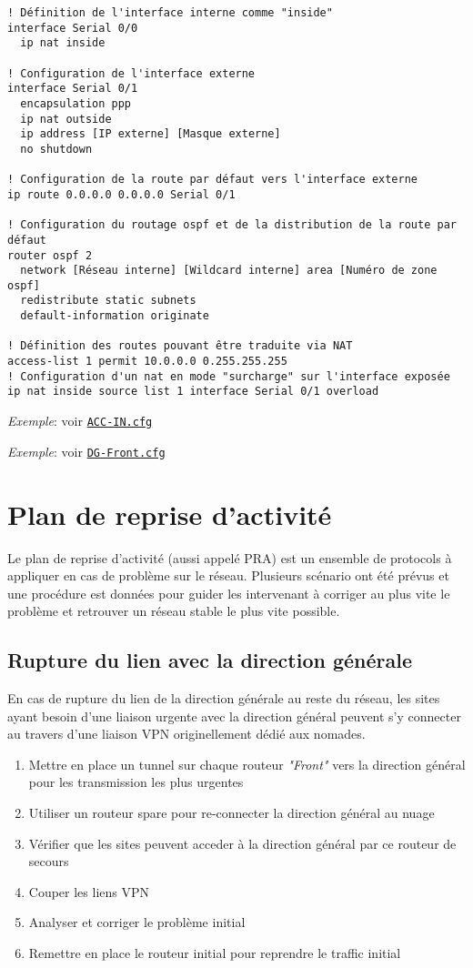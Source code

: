 \documentclass{article}
\newcommand{\seefile}[1]{
  \begin{center}
  \begin{minipage}{0.9\textwidth}
    \emph{Exemple}: voir \texttt{\href{https://github.com/EpicKiwi/Wide-Network-Project-Cesi-A4/blob/master/network/#1}{#1}}
  \end{minipage}
  \end{center}
}
\begin{document}
\begin{lstlisting}[caption=Configuration d'un accès internet avec NAT]
! Définition de l'interface interne comme "inside"
interface Serial 0/0
  ip nat inside

! Configuration de l'interface externe
interface Serial 0/1
  encapsulation ppp
  ip nat outside
  ip address [IP externe] [Masque externe]
  no shutdown

! Configuration de la route par défaut vers l'interface externe
ip route 0.0.0.0 0.0.0.0 Serial 0/1

! Configuration du routage ospf et de la distribution de la route par défaut
router ospf 2
  network [Réseau interne] [Wildcard interne] area [Numéro de zone ospf]
  redistribute static subnets
  default-information originate

! Définition des routes pouvant être traduite via NAT
access-list 1 permit 10.0.0.0 0.255.255.255
! Configuration d'un nat en mode "surcharge" sur l'interface exposée
ip nat inside source list 1 interface Serial 0/1 overload
\end{lstlisting}

\seefile{ACC-IN.cfg}
\seefile{DG-Front.cfg}

\section{Plan de reprise d'activité}

Le plan de reprise d'activité (aussi appelé PRA) est un ensemble de protocols à appliquer en cas de problème sur le réseau.
Plusieurs scénario ont été prévus et une procédure est données pour guider les intervenant à corriger au plus vite le problème et retrouver un réseau stable le plus vite possible.

\subsection{Rupture du lien avec la direction générale}

En cas de rupture du lien de la direction générale au reste du réseau, les sites ayant besoin d'une liaison urgente avec la direction général peuvent s'y connecter au travers d'une liaison VPN originellement dédié aux nomades.

\bigskip

\begin{enumerate}
\item Mettre en place un tunnel sur chaque routeur \emph{"Front"} vers la direction général pour les transmission les plus urgentes
\item Utiliser un routeur spare pour re-connecter la direction général au nuage
\item Vérifier que les sites peuvent acceder à la direction général par ce routeur de secours
\item Couper les liens VPN
\item Analyser et corriger le problème initial
\item Remettre en place le routeur initial pour reprendre le traffic initial
\end{enumerate}
\end{document}
